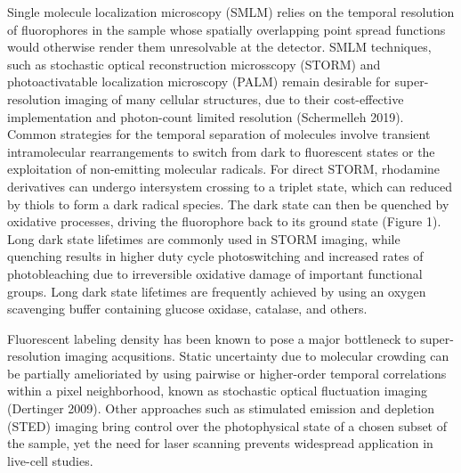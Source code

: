 \documentclass{ucetd}
\begin{document}
Single molecule localization microscopy (SMLM) relies on the temporal resolution of fluorophores in the sample whose spatially overlapping point spread functions would otherwise render them unresolvable at the detector. SMLM techniques, such as stochastic optical reconstruction microsscopy (STORM) and photoactivatable localization microscopy (PALM) remain desirable for super-resolution imaging of many cellular structures, due to their cost-effective implementation and photon-count limited resolution (Schermelleh 2019). Common strategies for the temporal separation of molecules involve transient intramolecular rearrangements to switch from dark to fluorescent states or the exploitation of non-emitting molecular radicals. For direct STORM, rhodamine derivatives can undergo intersystem crossing to a triplet state, which can reduced by thiols to form a dark radical species. The dark state can then be quenched by oxidative processes, driving the fluorophore back to its ground state (Figure 1). Long dark state lifetimes are commonly used in STORM imaging, while quenching results in higher duty cycle photoswitching and increased rates of photobleaching due to irreversible oxidative damage of important functional groups. Long dark state lifetimes are frequently achieved by using an oxygen scavenging buffer containing glucose oxidase, catalase, and others. 

Fluorescent labeling density has been known to pose a major bottleneck to super-resolution imaging acqusitions. Static uncertainty due to molecular crowding can be partially amelioriated by using pairwise or higher-order temporal correlations within a pixel neighborhood, known as stochastic optical fluctuation imaging (Dertinger 2009). Other approaches such as stimulated emission and depletion (STED) imaging bring control over the photophysical state of a chosen subset of the sample, yet the need for laser scanning prevents widespread application in live-cell studies. 
\end{document}
